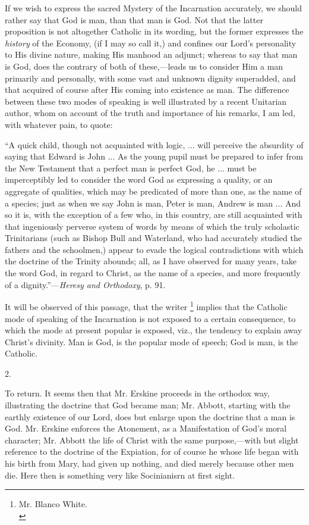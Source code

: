 If we wish to express the sacred Mystery of the
Incarnation accurately, we should rather say that God is man, than
that man is God. Not that the latter proposition is not altogether
Catholic in its wording, but the former expresses the \emph{history}
of the Economy, (if I may so call it,) and confines our Lord's
personality to His divine nature, making His manhood an adjunct;
whereas to say that man is God, does the contrary of both of
these,—leads us to consider Him a man primarily and personally, with
some vast and unknown dignity superadded, and that acquired of course
after His coming into existence as man. The difference between these
two modes of speaking is well illustrated by a recent Unitarian
author, whom on account of the truth and importance of his remarks, I
am led, with whatever pain, to quote:

``A quick child,
though not acquainted with logic, ... will perceive the absurdity of
saying that Edward is John ... As the young pupil must be prepared to
infer from the New Testament that a perfect man is perfect God, he ...
must be imperceptibly led to consider the word God as expressing a
quality, or an aggregate of
qualities, which may be predicated of more than one, as the name of a
species; just as when we say John is man, Peter is man, Andrew is man
... And so it is, with the exception of a few who, in this country,
are still acquainted with that ingeniously perverse system of words by
means of which the truly scholastic Trinitarians (such as Bishop Bull
and Waterland, who had accurately studied the fathers and the
schoolmen,) appear to evade the logical contradictions with which the
doctrine of the Trinity abounds; all, as I have observed for many
years, take the word God, in regard to Christ, as the name of a
species, and more frequently of a dignity.''—\emph{Heresy and
Orthodoxy}, p. 91.

It will be observed of this passage, that the
writer \footnote{Mr. Blanco White.\textbf{}\\} implies that the
Catholic mode of speaking of the Incarnation is not exposed to a
certain consequence, to which the mode at present popular is exposed,
viz., the tendency to explain away Christ's divinity. Man is God, is
the popular mode of speech; God is man, is the Catholic.

2.

To return. It seems then that Mr. Erskine
proceeds in the orthodox way, illustrating the doctrine that God
became man; Mr. Abbott, starting with the earthly existence of our
Lord, does but enlarge upon the doctrine that a man is God. Mr.
Erskine enforces the Atonement, as a Manifestation of God's moral
character; Mr. Abbott the life of Christ with the same purpose,—with
but slight reference to the doctrine of the Expiation, for of course
he whose life began with his birth from Mary, had given up nothing,
and died merely because other men die. Here then is something very
like Socinianisrn at first sight.


